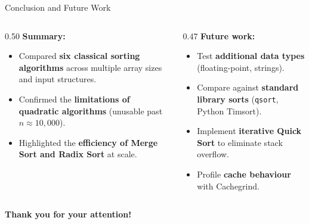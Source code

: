 \documentclass[aspectratio=169]{beamer}
\begin{document}
\begin{frame}{Conclusion and Future Work}
  \begin{columns}[T]
    \begin{column}{0.50\textwidth}
      \textbf{Summary:}
      \begin{itemize}
        \item Compared \textbf{six classical sorting algorithms} across multiple
              array sizes and input structures.
        \item Confirmed the \textbf{limitations of quadratic algorithms}
              (unusable past $n \approx 10{,}000$).
        \item Highlighted the \textbf{efficiency of Merge Sort and Radix Sort}
              at scale.
      \end{itemize}
    \end{column}
    \begin{column}{0.47\textwidth}
      \textbf{Future work:}
      \begin{itemize}
        \item Test \textbf{additional data types} (floating-point, strings).
        \item Compare against \textbf{standard library sorts}
              (\texttt{qsort}, Python Timsort).
        \item Implement \textbf{iterative Quick Sort} to eliminate stack overflow.
        \item Profile \textbf{cache behaviour} with Cachegrind.
      \end{itemize}
    \end{column}
  \end{columns}

  \vspace{1em}
  \begin{center}
    \large\textbf{Thank you for your attention!}
  \end{center}
\end{frame}
\end{document}
